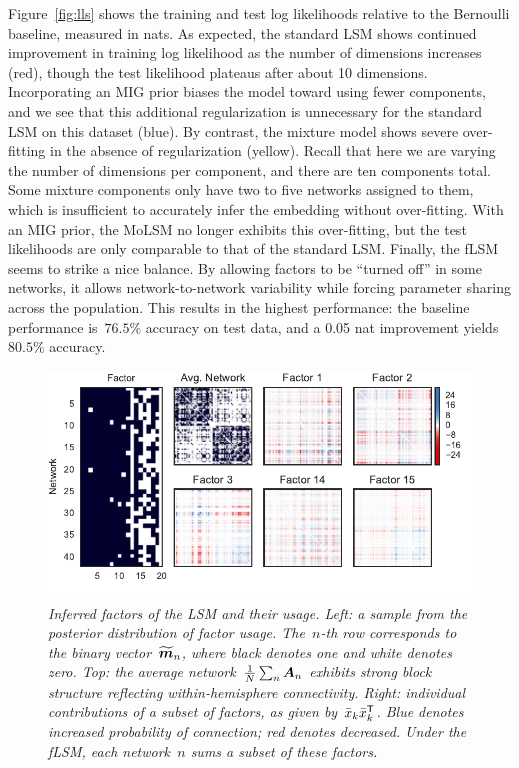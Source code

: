 Figure~\ref{fig:lls} shows the training and test log likelihoods
relative to the Bernoulli baseline, measured in nats. As expected, the
standard LSM shows continued improvement in training log likelihood as
the number of dimensions increases (red), though the test likelihood
plateaus after about 10 dimensions. Incorporating an MIG prior biases
the model toward using fewer components, and we see that this additional
regularization is unnecessary for the standard LSM on this dataset (blue).
By contrast, the mixture model shows severe over-fitting in the absence
of regularization (yellow).  Recall that here we are varying the number
of dimensions per component, and there are ten components total.  Some
mixture components only have two to five networks assigned to
them, which is insufficient to accurately infer the embedding without over-fitting.
With an MIG prior, the MoLSM no longer exhibits this over-fitting, but
the test likelihoods are only comparable to that of the standard LSM.
Finally, the fLSM seems to strike a nice balance.  By allowing factors
to be ``turned off'' in some networks, it allows network-to-network
variability while forcing parameter sharing across the population. This
results in the highest performance: the baseline performance is~$76.5\%$
accuracy on test data, and a 0.05 nat improvement yields~$80.5\%$ accuracy. 


\begin{figure}[t]
  \includegraphics[width=\linewidth]{figures/factors.pdf}
  \vspace{-.4in}
  \caption{\textit{Inferred factors of the LSM and their usage. Left:
      a sample from the posterior distribution of factor
      usage. The~$n$-th row corresponds to the binary
      vector~$\widetilde{\boldsymbol{m}}_n$, where black denotes one and white
      denotes zero. Top: the average
      network~${\tfrac{1}{N}\sum_n \boldsymbol{A}_n}$ exhibits strong block
      structure reflecting within-hemisphere connectivity.  Right:
      individual contributions of a subset of factors, as given
      by~$\bar{x}_k \bar{x}_k^{\mathsf{T}}$.  Blue denotes increased
      probability of connection; red denotes decreased. Under the
      fLSM, each network~$n$ sums a subset of these factors. }}
\label{fig:factors}
\end{figure}

